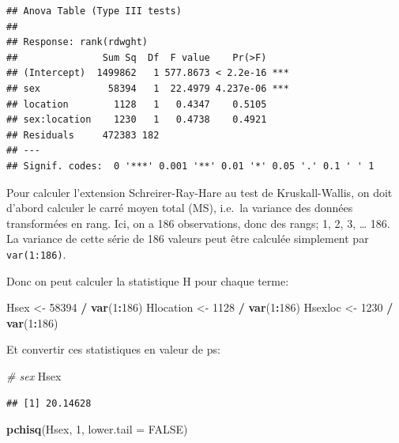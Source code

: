\documentclass[
  12pt,
]{book}
\newenvironment{Shaded}{\begin{snugshade}}{\end{snugshade}}
\newcommand{\CommentTok}[1]{\textcolor[rgb]{0.56,0.35,0.01}{\textit{#1}}}
\newcommand{\DataTypeTok}[1]{\textcolor[rgb]{0.13,0.29,0.53}{#1}}
\newcommand{\DecValTok}[1]{\textcolor[rgb]{0.00,0.00,0.81}{#1}}
\newcommand{\KeywordTok}[1]{\textcolor[rgb]{0.13,0.29,0.53}{\textbf{#1}}}
\newcommand{\NormalTok}[1]{#1}
\newcommand{\OperatorTok}[1]{\textcolor[rgb]{0.81,0.36,0.00}{\textbf{#1}}}
\newcommand{\OtherTok}[1]{\textcolor[rgb]{0.56,0.35,0.01}{#1}}
\newcommand{\StringTok}[1]{\textcolor[rgb]{0.31,0.60,0.02}{#1}}
\begin{document}
\begin{verbatim}
## Anova Table (Type III tests)
## 
## Response: rank(rdwght)
##               Sum Sq  Df  F value    Pr(>F)    
## (Intercept)  1499862   1 577.8673 < 2.2e-16 ***
## sex            58394   1  22.4979 4.237e-06 ***
## location        1128   1   0.4347    0.5105    
## sex:location    1230   1   0.4738    0.4921    
## Residuals     472383 182                       
## ---
## Signif. codes:  0 '***' 0.001 '**' 0.01 '*' 0.05 '.' 0.1 ' ' 1
\end{verbatim}

Pour calculer l'extension Schreirer-Ray-Hare au test de Kruskall-Wallis, on doit d'abord calculer le carré moyen total (MS), i.e.~la variance des données transformées en rang. Ici, on a 186 observations, donc des rangs; 1, 2, 3, \ldots{} 186. La variance de cette série de 186 valeurs peut être calculée simplement par \texttt{var(1:186)}.

Donc on peut calculer la statistique H pour chaque terme:

\begin{Shaded}
\begin{Highlighting}[]
\NormalTok{Hsex \textless{}{-}}\StringTok{ }\DecValTok{58394} \OperatorTok{/}\StringTok{ }\KeywordTok{var}\NormalTok{(}\DecValTok{1}\OperatorTok{:}\DecValTok{186}\NormalTok{)}
\NormalTok{Hlocation \textless{}{-}}\StringTok{ }\DecValTok{1128} \OperatorTok{/}\StringTok{ }\KeywordTok{var}\NormalTok{(}\DecValTok{1}\OperatorTok{:}\DecValTok{186}\NormalTok{)}
\NormalTok{Hsexloc \textless{}{-}}\StringTok{ }\DecValTok{1230} \OperatorTok{/}\StringTok{ }\KeywordTok{var}\NormalTok{(}\DecValTok{1}\OperatorTok{:}\DecValTok{186}\NormalTok{)}
\end{Highlighting}
\end{Shaded}

Et convertir ces statistiques en valeur de ps:

\begin{Shaded}
\begin{Highlighting}[]
\CommentTok{\# sex}
\NormalTok{Hsex}
\end{Highlighting}
\end{Shaded}

\begin{verbatim}
## [1] 20.14628
\end{verbatim}

\begin{Shaded}
\begin{Highlighting}[]
\KeywordTok{pchisq}\NormalTok{(Hsex, }\DecValTok{1}\NormalTok{, }\DataTypeTok{lower.tail =} \OtherTok{FALSE}\NormalTok{)}
\end{Highlighting}
\end{Shaded}
\end{document}
